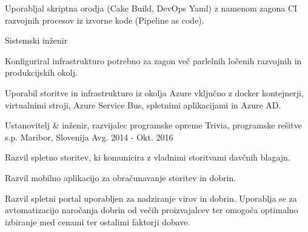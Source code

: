 \begin{cventries}
{\begin{cvitems}
        \item {Uporabljal skriptna orodja (Cake Build, DevOps Yaml) z
         namenom zagona CI razvojnih procesov iz izvorne kode (Pipeline as code).\\}
      \end{cvitems}
    }
    \cventry
    {Sistemski inženir} %
    {} %
    {} %
    {} %
    {
      \begin{cvitems} %
        \item {Konfiguriral infrastrukturo potrebno za zagon več
         parlelnih ločenih razvojnih in produkcijskih okolj.}
        \item {Uporabil storitve in infrastrukturo iz okolja Azure
         vključno z docker kontejnerji, virtualnimi stroji, Azure Service Bus,
          spletnimi aplikacijami in Azure AD.\\}
      \end{cvitems}
    }

  \cventry
    {Ustanovitelj \& inženir, razvijalec programske opreme} %
    {Trivia, programske rešitve s.p.} %
    {Maribor, Slovenija} %
    {Avg. 2014 - Okt. 2016} %
    {
      \begin{cvitems} %
        \item {Razvil spletno storitev, ki komunicira z vladnimi storitvami
         davčnih blagajn.}
        \item {Razvil mobilno aplikacijo za obračunavanje storitev in dobrin.}
        \item {Razvil spletni portal uporabljen za nadziranje virov in dobrin.
         Uporablja se za avtomatizacijo naročanja dobrin od večih
          proizvajalcev ter omogoča optimalno izbiranje med cenami
           ter ostalimi faktorji dobave.}
      \end{cvitems}
    }

\end{cventries}
